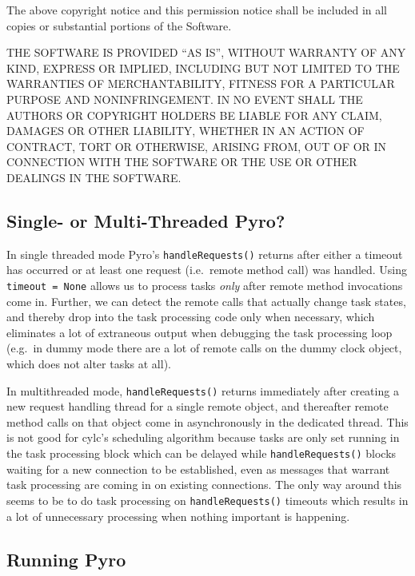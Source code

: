 \documentclass[11pt,a4paper]{article}
\begin{document}
The above copyright notice and this permission notice shall be included
in all copies or substantial portions of the Software.

THE SOFTWARE IS PROVIDED ``AS IS'', WITHOUT WARRANTY OF ANY KIND,
EXPRESS OR IMPLIED, INCLUDING BUT NOT LIMITED TO THE WARRANTIES OF
MERCHANTABILITY, FITNESS FOR A PARTICULAR PURPOSE AND NONINFRINGEMENT.
IN NO EVENT SHALL THE AUTHORS OR COPYRIGHT HOLDERS BE LIABLE FOR ANY
CLAIM, DAMAGES OR OTHER LIABILITY, WHETHER IN AN ACTION OF CONTRACT,
TORT OR OTHERWISE, ARISING FROM, OUT OF OR IN CONNECTION WITH THE
SOFTWARE OR THE USE OR OTHER DEALINGS IN THE SOFTWARE.
                                          
\subsection{Single- or Multi-Threaded Pyro?}
\label{Single-orMulti-ThreadedPyro?}

In single threaded mode Pyro's \lstinline=handleRequests()= returns
after either a timeout has occurred or at least one request
(i.e.\ remote method call) was handled. Using \lstinline|timeout = None| 
allows us to process tasks {\em only} after remote method invocations
come in.  Further, we can detect the remote calls that actually change
task states, and thereby drop into the task processing code only when
necessary, which eliminates a lot of extraneous output when debugging
the task processing loop (e.g.\ in dummy mode there are a lot of remote
calls on the dummy clock object, which does not alter tasks at all). 

In multithreaded mode, \lstinline=handleRequests()= returns immediately
after creating a new request handling thread for a single remote object,
and thereafter remote method calls on that object come in asynchronously
in the dedicated thread. This is not good for cylc's scheduling
algorithm because tasks are only set running in the task processing
block which can be delayed while \lstinline=handleRequests()= blocks waiting
for a new connection to be established, even as messages that warrant
task processing are coming in on existing connections. The only way
around this seems to be to do task processing on \lstinline=handleRequests()=
timeouts which results in a lot of unnecessary processing when nothing
important is happening.

\subsection{Running Pyro}
\label{RunningPyro}
\end{document}
